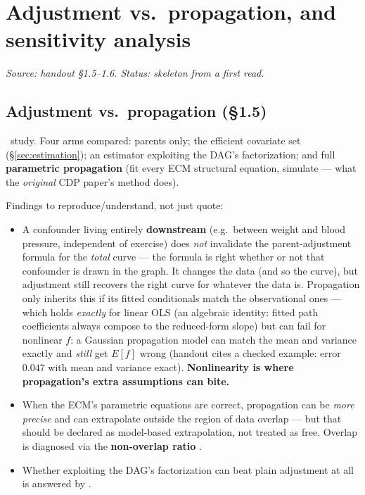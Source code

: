 \section{Adjustment vs.\ propagation, and sensitivity analysis}
\label{sec:propagation}

\emph{Source: handout \S1.5--1.6. Status: skeleton from a first read.}

\subsection{Adjustment vs.\ propagation (\S1.5)}

\newtag~study. Four arms compared: parents only; the efficient covariate set
(\S\ref{sec:estimation}); an estimator exploiting the DAG's factorization;
and full \textbf{parametric propagation} (fit every ECM structural equation,
simulate --- what the \emph{original} CDP paper's method does).

Findings to reproduce/understand, not just quote:
\begin{itemize}
  \item A confounder living entirely \textbf{downstream} (e.g.\ between
    weight and blood pressure, independent of exercise) does \emph{not}
    invalidate the parent-adjustment formula for the \emph{total} curve ---
    the formula is right whether or not that confounder is drawn in the
    graph. It changes the data (and so the curve), but adjustment still
    recovers the right curve for whatever the data is. Propagation only
    inherits this if its fitted conditionals match the observational ones
    --- which holds \emph{exactly} for linear OLS (an algebraic identity:
    fitted path coefficients always compose to the reduced-form slope) but
    can fail for nonlinear $f$: a Gaussian propagation model can match the
    mean and variance exactly and \emph{still} get $E[f]$ wrong (handout
    cites a checked example: error $0.047$ with mean and variance exact).
    \textbf{Nonlinearity is where propagation's extra assumptions can
    bite.}
  \item When the ECM's parametric equations are correct, propagation can be
    \emph{more precise} and can extrapolate outside the region of data
    overlap --- but that should be declared as model-based extrapolation,
    not treated as free. Overlap is diagnosed via the \textbf{non-overlap
    ratio} .
  \item Whether exploiting the DAG's factorization can beat plain adjustment
    at all is answered by .
\end{itemize}

